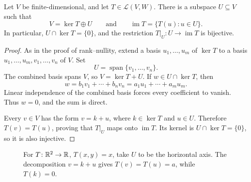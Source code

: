\begin{proposition}\label{prop:kernel-complement-image}
  Let $V$ be finite-dimensional, and let $T\in\mathcal L(V,W)$.
  There is a subspace $U\subseteq V$ such that
  \[
    V=\ker T\oplus U
    \qquad\text{and}\qquad
    \operatorname{im}T=\{T(u):u\in U\}.
  \]
  In particular, $U\cap\ker T=\{0\}$, and the restriction
  $T|_U\colon U\to\operatorname{im}T$ is bijective.
\end{proposition}

\begin{proof}
  As in the proof of rank--nullity, extend a basis $u_1,\ldots,u_m$
  of $\ker T$ to a basis $u_1,\ldots,u_m,v_1,\ldots,v_n$ of $V$.
  Set
  \[
    U=\operatorname{span}\{v_1,\ldots,v_n\}.
  \]
  The combined basis spans $V$, so $V=\ker T+U$. If $w\in U\cap\ker T$,
  then
  \[
    w=b_1v_1+\cdots+b_nv_n=a_1u_1+\cdots+a_mu_m.
  \]
  Linear independence of the combined basis forces every coefficient
  to vanish. Thus $w=0$, and the sum is direct.

  Every $v\in V$ has the form $v=k+u$, where $k\in\ker T$ and
  $u\in U$. Therefore $T(v)=T(u)$, proving that $T|_U$ maps onto
  $\operatorname{im}T$. Its kernel is $U\cap\ker T=\{0\}$, so it
  is also injective.
\end{proof}

\begin{figure}[htbp]
  \centering
  \caption{For $T\colon\mathbb{R}^2\to\mathbb{R}$, $T(x,y)=x$, take $U$ to
    be the horizontal axis. The decomposition $v=k+u$ gives
    $T(v)=T(u)=a$, while $T(k)=0$.}
  \label{fig:kernel-complement-projection}
\end{figure}
